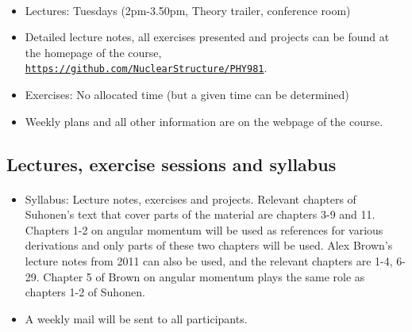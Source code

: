 \documentclass[%
oneside,                 %
final,                   %
10pt]{article}
\begin{document}
\paragraph{}
\begin{itemize}
\item Lectures: Tuesdays (2pm-3.50pm, Theory trailer, conference room)

\item Detailed lecture notes, all exercises presented and projects can be found at the homepage of the course, \href{{https://github.com/NuclearStructure/PHY981}}{\nolinkurl{https://github.com/NuclearStructure/PHY981}}.

\item Exercises: No allocated time (but a given time can be determined)

\item Weekly plans and all other information are on the webpage of the course.
\end{itemize}

\noindent




\subsection{Lectures, exercise sessions and syllabus}

\paragraph{}
\begin{itemize}
\item Syllabus: Lecture notes, exercises and projects. Relevant chapters of Suhonen's text that cover parts of the material are chapters 3-9 and 11. Chapters 1-2 on angular momentum will be used as references for various derivations and only parts of these two chapters will be used. Alex Brown's lecture notes from 2011 can also be used, and the relevant chapters are 1-4, 6-29. Chapter 5 of Brown on angular momentum plays the same role as chapters 1-2 of Suhonen. 

\item A weekly mail will be sent to all participants. 
\end{itemize}

\noindent




\end{document}
